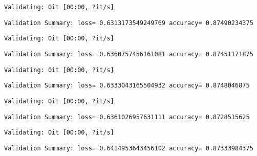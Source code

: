 \documentclass[11pt]{article}
\begin{document}
    
    \begin{Verbatim}[commandchars=\\\{\}]
Validating: 0it [00:00, ?it/s]
    \end{Verbatim}

    
    \begin{Verbatim}[commandchars=\\\{\}]
Validation Summary: loss= 0.6313173549249769 accuracy= 0.87490234375
    \end{Verbatim}

    
    \begin{Verbatim}[commandchars=\\\{\}]
Validating: 0it [00:00, ?it/s]
    \end{Verbatim}

    
    \begin{Verbatim}[commandchars=\\\{\}]
Validation Summary: loss= 0.6360757456161081 accuracy= 0.87451171875
    \end{Verbatim}

    
    \begin{Verbatim}[commandchars=\\\{\}]
Validating: 0it [00:00, ?it/s]
    \end{Verbatim}

    
    \begin{Verbatim}[commandchars=\\\{\}]
Validation Summary: loss= 0.6333043165504932 accuracy= 0.8748046875
    \end{Verbatim}

    
    \begin{Verbatim}[commandchars=\\\{\}]
Validating: 0it [00:00, ?it/s]
    \end{Verbatim}

    
    \begin{Verbatim}[commandchars=\\\{\}]
Validation Summary: loss= 0.6361026957631111 accuracy= 0.8728515625
    \end{Verbatim}

    
    \begin{Verbatim}[commandchars=\\\{\}]
Validating: 0it [00:00, ?it/s]
    \end{Verbatim}

    
    \begin{Verbatim}[commandchars=\\\{\}]
Validation Summary: loss= 0.6414953643456102 accuracy= 0.87333984375
    \end{Verbatim}
\end{document}
